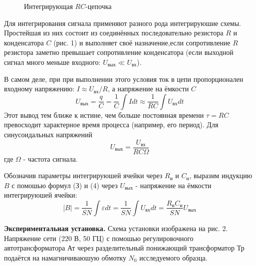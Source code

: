 \documentclass[14pt]{article}
\begin{document}
\begin{figure}[h!]
	\caption{Интегрирующая $RC$-цепочка}
	\label{fig:image}
\end{figure}

Для интегрирования сигнала применяют разного рода интегрируюшие схемы. Простейшая из них состоит из соединённых последовательно резистора $R$ и конденсатора $C$ (рис. 1) и выполняет своё назначение,если сопротивление $R$ резистора заметно превышает сопротивление конденсатора (если выходной сигнал много меньше входного: 
$U_{\text{вых}} \ll U_{\text{вх}}$).

В самом деле, при при выполнении этого условия ток в цепи пропорционален входному напряжению: $I \approx U_{\text{вх}}/R$, а напряжение на ёмкости $C$
\begin{equation}
U_{\text{вых}} = \frac{q}{C} = \frac{1}{C}\int Idt \approx \frac{1}{RC}\int U_{\text{вх}}dt
\end{equation}
Этот вывод тем ближе к истине, чем больше постоянная времени $\tau = RC$ превосходит характерное время процесса (например, его период). Для синусоидальных напряжений
\begin{equation}
U_{\text{вых}} = \frac{U_{\text{вх}}}{RC\Omega}
\end{equation}
где $\Omega$ - частота сигнала.

Обозначив параметры интегрируюшей ячейки через $R_{\text{и}}$ и $C_{\text{и}}$, выразим индукцию $B$ с помошью формул (З) и (4) через $U_{\text{вых}}$ - напряжение
на ёмкости интегрируюшей ячейки:
\begin{equation}
|B| = \frac{1}{SN}\int 	\varepsilon dt = \frac{1}{SN}\int U_{\text{вх}} dt = \frac{R_{\text{и}}C_{\text{и}}}{SN}U_{\text{вых}}
\end{equation}

\textbf{Экспериментальная установка.} Схема установки изображена на рис. 2. Напряжение сети (220 В, 50 ГЦ) с помошью регулировочного автотрансформатора $\text{Ат}$ через разделительный понижающий трансформатор $\text{Тр}$ подаётся на намагничиваюшую обмотку $N_0$ исследуемого образца.
\end{document}
